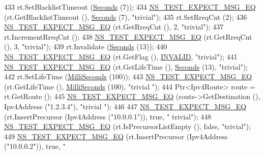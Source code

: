 \begin{DoxyCode}
433     rt.SetBlacklistTimeout (\hyperlink{group__timecivil_ga33c34b816f8ff6628e33d5c8e9713b9e}{Seconds} (7));
434     \hyperlink{group__testing_ga7304ba46a28d8cf08dfdfd6499cf7068}{NS\_TEST\_EXPECT\_MSG\_EQ} (rt.GetBlacklistTimeout (), 
      \hyperlink{group__timecivil_ga33c34b816f8ff6628e33d5c8e9713b9e}{Seconds} (7), \textcolor{stringliteral}{"trivial"});
435     rt.SetRreqCnt (2);
436     \hyperlink{group__testing_ga7304ba46a28d8cf08dfdfd6499cf7068}{NS\_TEST\_EXPECT\_MSG\_EQ} (rt.GetRreqCnt (), 2, \textcolor{stringliteral}{"trivial"});
437     rt.IncrementRreqCnt ();
438     \hyperlink{group__testing_ga7304ba46a28d8cf08dfdfd6499cf7068}{NS\_TEST\_EXPECT\_MSG\_EQ} (rt.GetRreqCnt (), 3, \textcolor{stringliteral}{"trivial"});
439     rt.Invalidate (\hyperlink{group__timecivil_ga33c34b816f8ff6628e33d5c8e9713b9e}{Seconds} (13));
440     \hyperlink{group__testing_ga7304ba46a28d8cf08dfdfd6499cf7068}{NS\_TEST\_EXPECT\_MSG\_EQ} (rt.GetFlag (), \hyperlink{group__aodv_gga44216921a9c725a5ab8bc19059052a26a0d7b8118b2af9344a91683148f1261c3}{INVALID}, \textcolor{stringliteral}{"trivial"});
441     \hyperlink{group__testing_ga7304ba46a28d8cf08dfdfd6499cf7068}{NS\_TEST\_EXPECT\_MSG\_EQ} (rt.GetLifeTime (), \hyperlink{group__timecivil_ga33c34b816f8ff6628e33d5c8e9713b9e}{Seconds} (13), \textcolor{stringliteral}{"trivial"});
442     rt.SetLifeTime (\hyperlink{group__timecivil_gaf26127cf4571146b83a92ee18679c7a9}{MilliSeconds} (100));
443     \hyperlink{group__testing_ga7304ba46a28d8cf08dfdfd6499cf7068}{NS\_TEST\_EXPECT\_MSG\_EQ} (rt.GetLifeTime (), \hyperlink{group__timecivil_gaf26127cf4571146b83a92ee18679c7a9}{MilliSeconds} (100), \textcolor{stringliteral}{"trivial
      "});
444     Ptr<Ipv4Route> route = rt.GetRoute ();
445     \hyperlink{group__testing_ga7304ba46a28d8cf08dfdfd6499cf7068}{NS\_TEST\_EXPECT\_MSG\_EQ} (route->GetDestination (), Ipv4Address (\textcolor{stringliteral}{"1.2.3.4"}), \textcolor{stringliteral}{"trivial
      "});
446 
447     \hyperlink{group__testing_ga7304ba46a28d8cf08dfdfd6499cf7068}{NS\_TEST\_EXPECT\_MSG\_EQ} (rt.InsertPrecursor (Ipv4Address (\textcolor{stringliteral}{"10.0.0.1"})), \textcolor{keyword}{true}, \textcolor{stringliteral}{"
      trivial"});
448     \hyperlink{group__testing_ga7304ba46a28d8cf08dfdfd6499cf7068}{NS\_TEST\_EXPECT\_MSG\_EQ} (rt.IsPrecursorListEmpty (), \textcolor{keyword}{false}, \textcolor{stringliteral}{"trivial"});
449     \hyperlink{group__testing_ga7304ba46a28d8cf08dfdfd6499cf7068}{NS\_TEST\_EXPECT\_MSG\_EQ} (rt.InsertPrecursor (Ipv4Address (\textcolor{stringliteral}{"10.0.0.2"})), \textcolor{keyword}{true}, \textcolor{stringliteral}{"
}
\end{DoxyCode}
